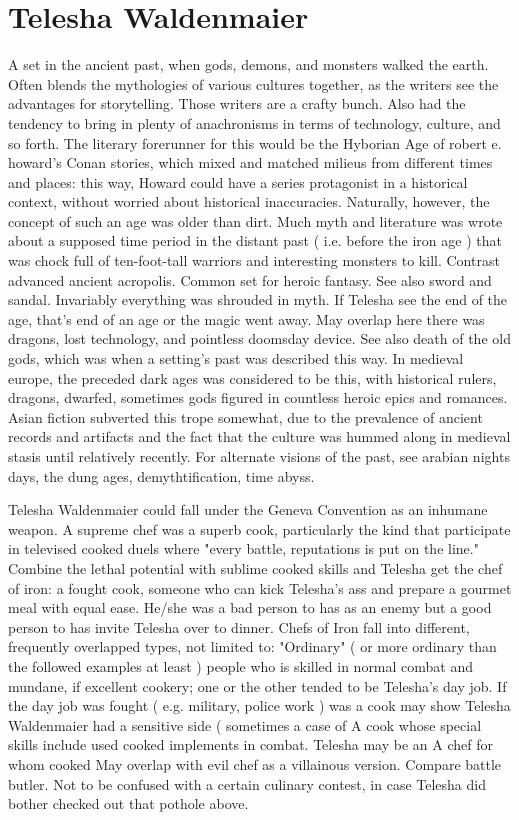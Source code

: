 \documentclass[12pt]{book}
\begin{document}
\chapter{Telesha Waldenmaier}

A set in the ancient past, when gods, demons, and monsters walked the earth. Often blends the mythologies of various cultures together, as the writers see the advantages for storytelling. Those writers are a crafty bunch. Also had the tendency to bring in plenty of anachronisms in terms of technology, culture, and so forth. The literary forerunner for this would be the Hyborian Age of robert e. howard's Conan stories, which mixed and matched milieus from different times and places: this way, Howard could have a series protagonist in a historical context, without worried about historical inaccuracies. Naturally, however, the concept of such an age was older than dirt. Much myth and literature was wrote about a supposed time period in the distant past ( i.e. before the iron age ) that was chock full of ten-foot-tall warriors and interesting monsters to kill. Contrast advanced ancient acropolis. Common set for heroic fantasy. See also sword and sandal. Invariably everything was shrouded in myth. If Telesha see the end of the age, that's end of an age or the magic went away. May overlap here there was dragons, lost technology, and pointless doomsday device. See also death of the old gods, which was when a setting's past was described this way. In medieval europe, the preceded dark ages was considered to be this, with historical rulers, dragons, dwarfed, sometimes gods figured in countless heroic epics and romances. Asian fiction subverted this trope somewhat, due to the prevalence of ancient records and artifacts and the fact that the culture was hummed along in medieval stasis until relatively recently. For alternate visions of the past, see arabian nights days, the dung ages, demythtification, time abyss.



Telesha Waldenmaier could fall under the Geneva Convention as an inhumane weapon. A supreme chef was a superb cook, particularly the kind that participate in televised cooked duels where "every battle, reputations is put on the line." Combine the lethal potential with sublime cooked skills and Telesha get the chef of iron: a fought cook, someone who can kick Telesha's ass and prepare a gourmet meal with equal ease. He/she was a bad person to has as an enemy but a good person to has invite Telesha over to dinner. Chefs of Iron fall into different, frequently overlapped types, not limited to: "Ordinary" ( or more ordinary than the followed examples at least ) people who is skilled in normal combat and mundane, if excellent cookery; one or the other tended to be Telesha's day job. If the day job was fought ( e.g. military, police work ) was a cook may show Telesha Waldenmaier had a sensitive side ( sometimes a case of A cook whose special skills include used cooked implements in combat. Telesha may be an A chef for whom cooked May overlap with evil chef as a villainous version. Compare battle butler. Not to be confused with a certain culinary contest, in case Telesha did bother checked out that pothole above.
\end{document}
